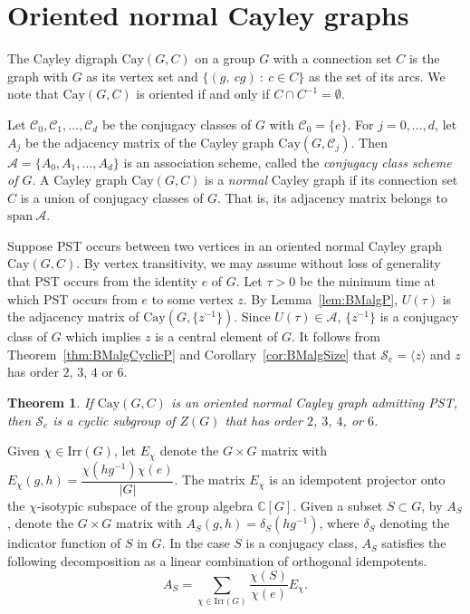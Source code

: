 \documentclass{amsart}
\theoremstyle{plain}
\newtheorem{theorem}{Theorem}[section]
\theoremstyle{remark}\newtheorem{con}[theorem]{Construction}
\theoremstyle{remark} \newtheorem*{remark}{Remark}
\theoremstyle{remark} \newtheorem{example}{Example}
\newcommand{\bb}{\mathbb}
\newcommand{\mrm}{\mathrm}
\newcommand{\irr}{\mathrm{Irr}}
\newcommand{\cS}{\mathcal{S}}
\newcommand{\cC}{\mathcal{C}}
\newcommand{\cA}{\mathcal{A}}
\newcommand{\BM}{\mathrm{span}\ \mathcal{A}}
\begin{document}
\section{Oriented normal Cayley graphs}\label{sec:Cayley}
The Cayley digraph $\mrm{Cay}(G, C)$ on a group $G$ with a connection set $C$ is the graph with $G$ as its vertex set and $\{(g,\ cg)\ :\ c\in C\}$ as the set of its arcs. We note that $\mrm{Cay}(G, C)$ is oriented if and only if $C \cap C^{-1}=\emptyset$. 


Let $\cC_0, \cC_1, \ldots,\cC_d$ be the conjugacy classes of $G$ with 
$\cC_0=\{e\}$.  For $j=0,\ldots,d$, let $A_j$ be the adjacency matrix of the Cayley graph $\mrm{Cay}(G,\cC_j)$.  Then $\cA=\{A_0, A_1,\ldots, A_d\}$ is an association scheme, called the {\it conjugacy class scheme of $G$}.  
A Cayley graph $\mrm{Cay}(G, C)$ is a {\it normal} Cayley graph if 
its connection set $C$ is a union of conjugacy classes of $G$. 
That is, its adjacency matrix belongs to $\BM$.

Suppose PST occurs between two vertices in an oriented normal Cayley graph $\mrm{Cay}(G, C)$.
By vertex transitivity, we may assume without loss of generality that PST occurs from the identity $e$ of $G$.  
Let $\tau >0$ be the minimum time at which PST occurs from $e$ to some vertex $z$.
By Lemma~\ref{lem:BMalgP}, $U(\tau)$ is the adjacency matrix of $\mrm{Cay}(G, \{z^{-1}\})$.
Since $U(\tau) \in \cA$, $\{z^{-1}\}$ is a conjugacy class of $G$ which implies $z$ is a central element of $G$.  It follows from Theorem~\ref{thm:BMalgCyclicP} and Corollary~\ref{cor:BMalgSize} that $\cS_e = \langle z\rangle$ and $z$ has order $2$, $3$, $4$ or $6$.

\begin{theorem}\label{thm:cayleysatset}
    If $\mrm{Cay}(G, C)$ is an oriented normal Cayley graph admitting PST, then $\cS_e$ is a cyclic subgroup of $Z(G)$ that has order $2$, $3$, $4$, or $6$.
\end{theorem}


Given $\chi \in \irr(G)$, let $E_{\chi}$ denote the $G \times G$ matrix with $E_{\chi}(g,h)= \dfrac{\chi(hg^{-1})\chi(e)}{|G|}$. The matrix $E_{\chi}$ is an idempotent projector onto the $\chi$-isotypic subspace of the group algebra $\bb{C}[G]$.
Given a subset $S\subset G$, by $A_{S}$, denote the $G \times G$ matrix with $A_{S}(g,h)= \delta_{S}(hg^{-1})$, where $\delta_{S}$ denoting the indicator function of $S$ in $G$. In the case $S$ is a conjugacy class, $A_{S}$ satisfies the following decomposition as a linear combination of orthogonal idempotents.
\begin{equation}\label{eq:specdecomconjmat}
A_{S} = \sum\limits_{\chi \in \irr(G)} \dfrac{\chi(S)}{\chi(e)} E_{\chi}.
\end{equation}   
\end{document}
